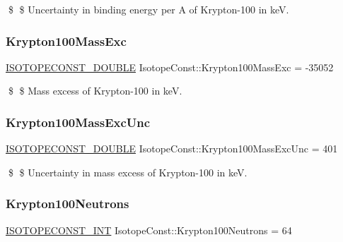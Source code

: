 \$ \$ Uncertainty in binding energy per A of Krypton-\/100 in keV. \mbox{\label{group___isotope_const-_krypton-_kr100_ga3452e9c46e9c58f7fc5a174e6a8dd860}} 
\subsubsection{\texorpdfstring{Krypton100\+Mass\+Exc}{Krypton100MassExc}}
{\footnotesize\ttfamily \mbox{\hyperlink{group___isotope_const-_macros_ga8f45a7272ce02c0b4c65c44636ed719a}{I\+S\+O\+T\+O\+P\+E\+C\+O\+N\+S\+T\+\_\+\+D\+O\+U\+B\+LE}} Isotope\+Const\+::\+Krypton100\+Mass\+Exc = -\/35052}

\$ \$ Mass excess of Krypton-\/100 in keV. \mbox{\label{group___isotope_const-_krypton-_kr100_ga331ff081bea67d1ebc2e40536e2ef192}} 
\subsubsection{\texorpdfstring{Krypton100\+Mass\+Exc\+Unc}{Krypton100MassExcUnc}}
{\footnotesize\ttfamily \mbox{\hyperlink{group___isotope_const-_macros_ga8f45a7272ce02c0b4c65c44636ed719a}{I\+S\+O\+T\+O\+P\+E\+C\+O\+N\+S\+T\+\_\+\+D\+O\+U\+B\+LE}} Isotope\+Const\+::\+Krypton100\+Mass\+Exc\+Unc = 401}

\$ \$ Uncertainty in mass excess of Krypton-\/100 in keV. \mbox{\label{group___isotope_const-_krypton-_kr100_ga3c8496200469dda538d529f3dfce9db6}} 
\subsubsection{\texorpdfstring{Krypton100\+Neutrons}{Krypton100Neutrons}}
{\footnotesize\ttfamily \mbox{\hyperlink{group___isotope_const-_macros_ga5f18360b3e99483a35c32d789e62621c}{I\+S\+O\+T\+O\+P\+E\+C\+O\+N\+S\+T\+\_\+\+I\+NT}} Isotope\+Const\+::\+Krypton100\+Neutrons = 64}

